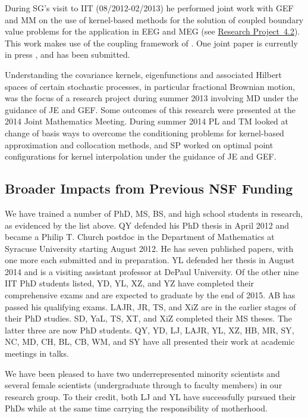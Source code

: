 \documentclass[11pt]{NSFamsart}
\newcommand{\refprobdb}{\hyperref[SectMEEG]{Research Project~4.2}\xspace}
\begin{document}
During SG's visit to IIT (08/2012-02/2013) he performed joint work with GEF and MM on the use of kernel-based methods for the solution of coupled boundary value problems for the application in EEG and MEG (see \refprobdb). This work makes use of the coupling framework of \cite{McCF14}. One joint paper is currently in press \citep{AFFGM15}, and \citep{AFFGM13} has been submitted.

Understanding the covariance kernels, eigenfunctions and associated Hilbert spaces of certain stochastic processes, in particular fractional Brownian motion, was the focus of a research project during summer 2013 involving MD under the guidance of JE and GEF. Some outcomes of this research were presented at the 2014 Joint Mathematics Meeting. During summer 2014 PL and TM looked at change of basis ways to overcome
the conditioning problems for kernel-based approximation
and collocation methods, and SP worked on optimal point configurations for kernel
interpolation under the guidance of JE and GEF.

\subsection{Broader Impacts from Previous NSF Funding}

We have trained a number of PhD, MS, BS, and high school students in research, as evidenced by the list above.  QY defended his PhD thesis in April 2012 and became a Philip T. Church postdoc in the Department of Mathematics at Syracuse University starting August 2012. He has seven published papers, with one more each submitted and in preparation.  YL defended her thesis in August 2014 and is a visiting assistant professor at DePaul University.  Of the other nine IIT PhD students listed, YD, YL, XZ, and YZ have completed their comprehensive exams and are expected to graduate by the end of 2015.  AB has passed his qualifying exams.  LAJR, JR, TS, and XiZ are in the earlier stages of their PhD studies. SD, YaL, TS, XT, and XiZ completed their MS theses. The latter three are now PhD students.  QY, YD, LJ, LAJR, YL, XZ, HB, MR, SY, NC, MD, CH, BL, CB, WM, and SY have all presented their work at academic meetings in talks.

We have been pleased to have two underrepresented minority scientists and several female scientists (undergraduate through to faculty members) in our research group.  To their credit, both LJ and YL have successfully pursued their PhDs while at the same time carrying the responsibility of motherhood.
\end{document}
